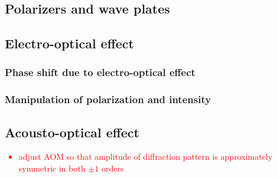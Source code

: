\subsection{Polarizers and wave plates}


\subsection{Electro-optical effect}

\subsubsection{Phase shift due to electro-optical effect}

\subsubsection{Manipulation of polarization and intensity}


\subsection{Acousto-optical effect}
\textcolor{red}{
    \begin{itemize}
        \item adjust AOM so that amplitude of diffraction pattern is
        approximately symmetric in both $\pm 1$ orders
    \end{itemize}
}

